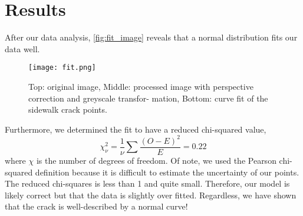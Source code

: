 \documentclass{article}
\begin{document}
\section{Results}
After our data analysis, \autoref{fig:fit_image} reveals that a normal distribution fits our data well.
\begin{figure}[h!]
    \centering
    \texttt{[image: fit.png]}
    \caption{Top: original image, Middle: processed image with perspective correction and greyscale transfor- mation, Bottom: curve fit of the sidewalk crack points.}
    \label{fig:fit_image}
\end{figure}
Furthermore, we determined the fit to have a reduced chi-squared value,
\begin{equation}
{\chi}_{\nu}^2 = \frac{1}{\nu} \sum \frac{(O - E)^2}{E} = 0.22
\label{eq:chi_squared}
\end{equation}
where $\chi$ is the number of degrees of freedom. Of note, we used the Pearson chi-squared definition because it is difficult to estimate the uncertainty of our points.
\newpage
The reduced chi-squares is less than 1 and quite small. Therefore, our model is likely correct but that the data is slightly over fitted. Regardless, we have shown that the crack is well-described by a normal curve!



\nocite{*}
\end{document}
